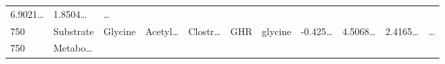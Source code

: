 \documentclass[
]{article}
\begin{document}
\begin{longtable}[]{@{}lllllllllll@{}}
\begin{minipage}[t]{0.07\columnwidth}
6.9021\ldots{}\strut
\end{minipage} & \begin{minipage}[t]{0.07\columnwidth}\raggedright
1.8504\ldots{}\strut
\end{minipage} & \begin{minipage}[t]{0.03\columnwidth}\raggedright
\ldots{}\strut
\end{minipage}\tabularnewline
\begin{minipage}[t]{0.03\columnwidth}\raggedright
750\strut
\end{minipage} & \begin{minipage}[t]{0.07\columnwidth}\raggedright
Substrate\strut
\end{minipage} & \begin{minipage}[t]{0.07\columnwidth}\raggedright
Glycine\strut
\end{minipage} & \begin{minipage}[t]{0.09\columnwidth}\raggedright
Acetyl\ldots{}\strut
\end{minipage} & \begin{minipage}[t]{0.07\columnwidth}\raggedright
Clostr\ldots{}\strut
\end{minipage} & \begin{minipage}[t]{0.07\columnwidth}\raggedright
GHR\strut
\end{minipage} & \begin{minipage}[t]{0.09\columnwidth}\raggedright
glycine\strut
\end{minipage} & \begin{minipage}[t]{0.07\columnwidth}\raggedright
-0.425\ldots{}\strut
\end{minipage} & \begin{minipage}[t]{0.07\columnwidth}\raggedright
4.5068\ldots{}\strut
\end{minipage} & \begin{minipage}[t]{0.07\columnwidth}\raggedright
2.4165\ldots{}\strut
\end{minipage} & \begin{minipage}[t]{0.03\columnwidth}\raggedright
\ldots{}\strut
\end{minipage}\tabularnewline
\begin{minipage}[t]{0.03\columnwidth}\raggedright
750\strut
\end{minipage} & \begin{minipage}[t]{0.07\columnwidth}\raggedright
Metabo\ldots{}\strut
\end{minipage} & \begin{minipage}[t]{0.07\columnwidth}\raggedright

\end{minipage}
\end{longtable}
\end{document}
